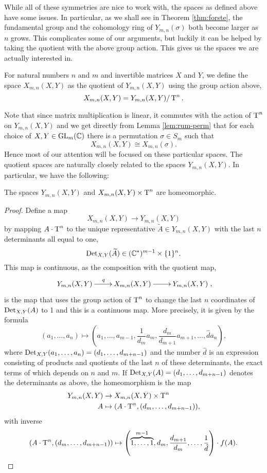 While all of these symmetries are nice
to work with, the spaces as defined above have some issues. In
particular, as we shall see in Theorem \ref{thm:forste}, the
fundamental group and the cohomology ring of
$Y_{m,n}(\sigma)$ both become larger as $n$ grows. This complicates
some of our arguments, but luckily it can be helped by taking the
quotient with the above group action. This gives us the spaces we are
actually interested in.

\begin{definition}
  \label{def:kvotientrum}
  For natural numbers $n$ and $m$ and invertible matrices $X$ and $Y$,
  we define the space $X_{m,n}(X,Y)$ as the quotient of $Y_{m,n}(X,Y)$
  using the group action above,
  \[ X_{m,n}(X,Y) = Y_{m,n}(X,Y) / \operatorname{T}^n. \]
\end{definition}

Note that since matrix multiplication is linear, it commutes with the
action of $\operatorname{T}^n$ on $Y_{m,n}(X,Y)$ and we get directly from Lemma
\ref{lem:rum-perm} that for each choice of ${X,Y\in \operatorname{GL}_m(\mathbb{C})}$ there
is a permutation $\sigma \in S_m$ such that
\[ X_{m,n}(X,Y) \cong X_{m,n}(\sigma). \]
Hence most of our attention will be focused on these particular
spaces. The quotient spaces are naturally closely related to the
spaces $Y_{m,n}(X,Y)$. In particular, we have the following:

\begin{lemma}
  \label{lem:reduktion}
  The spaces $Y_{m,n}(X,Y)$ and $X_{m,n}(X,Y) \times \operatorname{T}^n$ are
  homeomorphic.
\end{lemma}
\begin{proof}
  Define a map
  \[ X_{m,n}(X,Y) \to Y_{m,n}(X,Y) \]
  by mapping $A\cdot \operatorname{T}^n$ to the unique representative
  $\widetilde{A} \in Y_{m,n}(X,Y)$ with the last
  $n$ determinants all equal to one,
  \[ \operatorname{Det}_{X,Y}(\widetilde{A}) \in (\mathbb{C}^*)^{m-1} \times
  \{1\}^n. \]
  This map is continuous, as the composition with the quotient map,
  \[ \xymatrix{Y_{m,n}(X,Y) \ar[r]^q & X_{m,n}(X,Y) \ar[r] &
    Y_{m,n}(X,Y)}, \]
  is the map that uses the group action of $\operatorname{T}^n$ to change the last
  $n$ coordinates of $\operatorname{Det}_{X,Y}(A)$ to 1 and this is a continuous
  map. More precisely, it is given by the formula
  \[ (a_1,\dots,a_n) \mapsto \left(a_1,\dots,a_{m-1},\frac{1}{d_m}a_m,
    \frac{d_m}{d_{m+1}} a_{m+1},\dots,\hat{d}a_n\right), \]
  where $\operatorname{Det}_{X,Y}(a_1,\dots,a_n) = (d_1,\dots,d_{m+n-1})$ and the
  number $\hat{d}$ is an expression consisting of products and
  quotients of the last $n$ of these
  determinants, the exact terms of which depends on $n$ and $m$. If
  $\operatorname{Det}_{X,Y}(A) = (d_1,\dots,d_{m+n-1})$ denotes the determinants as
  above, the homeomorphism is the map
  \begin{align*}
    Y_{m,n}(X,Y) &\to X_{m,n}(X,Y) \times \operatorname{T}^n\\
    A &\mapsto (A\cdot \operatorname{T}^n, (d_m,\dots,d_{m+n-1})),
  \end{align*}
  with inverse
  \[ (A\cdot \operatorname{T}^n, (d_m,\dots, d_{m+n-1})) \mapsto
  \left(\overbrace{1,\dots,1}^{m-1},d_m,\frac{d_{m+1}}{d_m},\dots,
    \frac{1}{\hat{d}}\right) \cdot f(A). \]
\end{proof}

